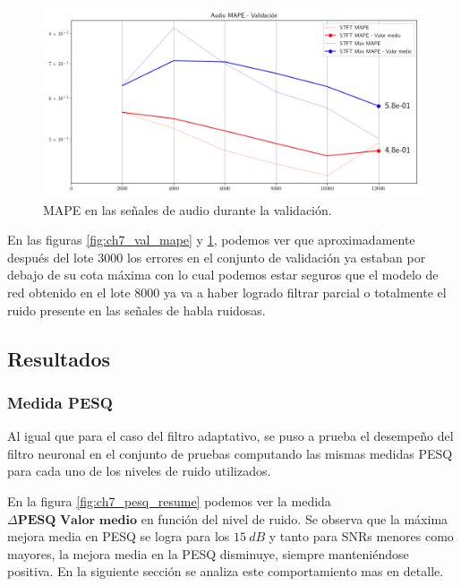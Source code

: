 \begin{figure}
	\centering
	\centerline{\includegraphics[scale=0.65]{images/ch7/entrenamiento/val_audio_mape.png}}
	\caption{MAPE en las señales de audio durante la validación.}
	\label{fig:ch7_val_audio_mape}
\end{figure}

En las figuras \ref{fig:ch7_val_mape} y \ref{fig:ch7_val_audio_mape}, podemos ver que aproximadamente después del lote 3000 los errores en el conjunto de validación ya estaban por debajo de su cota máxima con lo cual podemos estar seguros que el modelo de red obtenido en el lote 8000 ya va a haber logrado filtrar parcial o totalmente el ruido presente en las señales de habla ruidosas.

\subsection{Resultados}
\label{sec:resultados_filtro_neuronal}

\subsubsection{Medida PESQ}

Al igual que para el caso del filtro adaptativo, se puso a prueba el desempeño del filtro neuronal en el conjunto de pruebas computando las mismas medidas PESQ para cada uno de los niveles de ruido utilizados. 

En la figura \ref{fig:ch7_pesq_resume} podemos ver la medida $\Delta \textbf{PESQ Valor medio}$ en función del nivel de ruido. Se observa que la máxima mejora media en PESQ se logra para los $\SI{15}{dB}$ y tanto para SNRs menores como mayores, la mejora media en la PESQ disminuye, siempre manteniéndose positiva. En la siguiente sección se analiza este comportamiento mas en detalle.

